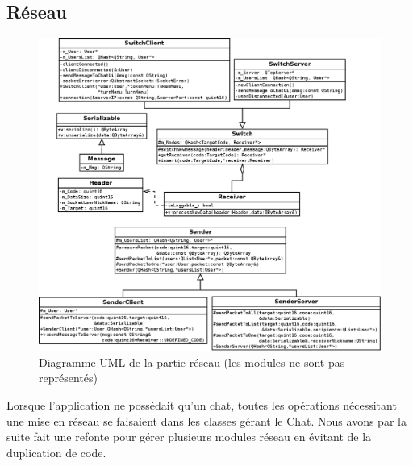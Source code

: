 \subsection{Réseau}

\begin{figure}[h!]
	\centering
	\includegraphics[width=\textwidth]{img/network_uml.png}
	\caption{Diagramme UML de la partie réseau (les modules ne sont pas représentés)}
\end{figure}

Lorsque l'application ne possédait qu'un chat, toutes les opérations nécessitant une mise en réseau se faisaient dans les classes gérant le Chat. Nous avons par la suite fait une refonte pour gérer plusieurs modules réseau en évitant de la duplication de code.\\

